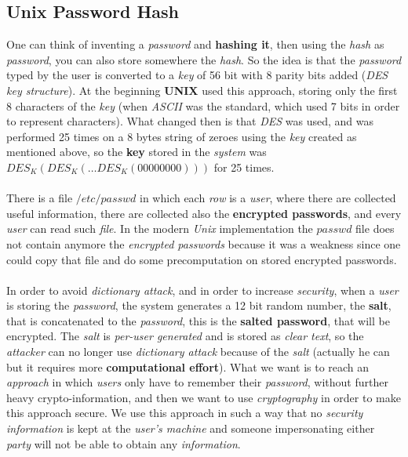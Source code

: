 \documentclass{article}
\begin{document}
\subsection{Unix Password Hash}
One can think of inventing a \emph{password} and \textbf{hashing it}, then using the \emph{hash} as \emph{password}, you can also store somewhere the \emph{hash}. So the idea is that the \emph{password} typed by the user is converted to a \emph{key} of 56 bit with 8 parity bits added (\emph{DES key structure}). At the beginning \textbf{UNIX} used this approach, storing only the first 8 characters of the \emph{key} (when \emph{ASCII} was the standard, which used 7 bits in order to represent characters). What changed then is that \emph{DES} was used, and was performed 25 times on a 8 bytes string of zeroes using the \emph{key} created as mentioned above, so the \textbf{key} stored in the \emph{system} was $DES_K(DES_K(…DES_K(00000000)))$ for 25 times. \\\\
There is a file $/etc/passwd$ in which each \emph{row} is a \emph{user}, where there are collected useful information, there are collected also the \textbf{encrypted passwords}, and every \emph{user} can read such \emph{file}. In the modern \emph{Unix} implementation the $passwd$ file does not contain anymore the \emph{encrypted passwords} because it was a weakness since one could copy that file and do some precomputation on stored encrypted passwords.\\\\
In order to avoid \emph{dictionary attack}, and in order to increase \emph{security}, when a \emph{user} is storing the \emph{password}, the system generates a 12 bit random number, the \textbf{salt}, that is concatenated to the \emph{password}, this is the \textbf{salted password}, that will be encrypted. The \emph{salt} is \emph{per-user generated} and is stored as \emph{clear text}, so the \emph{attacker} can no longer use \emph{dictionary attack} because of the \emph{salt} (actually he can but it requires more \textbf{computational effort}). What we want is to reach an \emph{approach} in which \emph{users} only have to remember their \emph{password}, without further heavy crypto-information, and then we want to use \emph{cryptography} in order to make this approach secure. We use this approach in such a way that no \emph{security information} is kept at the \emph{user's machine} and someone impersonating either \emph{party} will not be able to obtain any \emph{information}.
\end{document}
